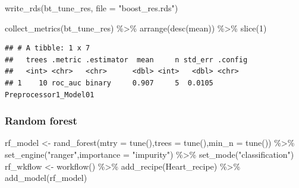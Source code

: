 \documentclass[
]{article}
\newenvironment{Shaded}{\begin{snugshade}}{\end{snugshade}}
\newcommand{\AttributeTok}[1]{\textcolor[rgb]{0.77,0.63,0.00}{#1}}
\newcommand{\DecValTok}[1]{\textcolor[rgb]{0.00,0.00,0.81}{#1}}
\newcommand{\FunctionTok}[1]{\textcolor[rgb]{0.00,0.00,0.00}{#1}}
\newcommand{\NormalTok}[1]{#1}
\newcommand{\OtherTok}[1]{\textcolor[rgb]{0.56,0.35,0.01}{#1}}
\newcommand{\SpecialCharTok}[1]{\textcolor[rgb]{0.00,0.00,0.00}{#1}}
\newcommand{\StringTok}[1]{\textcolor[rgb]{0.31,0.60,0.02}{#1}}
\begin{document}
\begin{Shaded}
\begin{Highlighting}[]
\FunctionTok{write\_rds}\NormalTok{(bt\_tune\_res, }\AttributeTok{file =} \StringTok{"boost\_res.rds"}\NormalTok{)}
\end{Highlighting}
\end{Shaded}

\begin{Shaded}
\begin{Highlighting}[]
\FunctionTok{collect\_metrics}\NormalTok{(bt\_tune\_res) }\SpecialCharTok{\%\textgreater{}\%} \FunctionTok{arrange}\NormalTok{(}\FunctionTok{desc}\NormalTok{(mean)) }\SpecialCharTok{\%\textgreater{}\%} \FunctionTok{slice}\NormalTok{(}\DecValTok{1}\NormalTok{)}
\end{Highlighting}
\end{Shaded}

\begin{verbatim}
## # A tibble: 1 x 7
##   trees .metric .estimator  mean     n std_err .config              
##   <int> <chr>   <chr>      <dbl> <int>   <dbl> <chr>                
## 1    10 roc_auc binary     0.907     5  0.0105 Preprocessor1_Model01
\end{verbatim}

\hypertarget{random-forest}{%
\subsubsection{Random forest}\label{random-forest}}

\begin{Shaded}
\begin{Highlighting}[]
\NormalTok{ rf\_model }\OtherTok{\textless{}{-}} \FunctionTok{rand\_forest}\NormalTok{(}\AttributeTok{mtry =} \FunctionTok{tune}\NormalTok{(),}\AttributeTok{trees =} \FunctionTok{tune}\NormalTok{(),}\AttributeTok{min\_n =} \FunctionTok{tune}\NormalTok{()) }\SpecialCharTok{\%\textgreater{}\%}
  \FunctionTok{set\_engine}\NormalTok{(}\StringTok{"ranger"}\NormalTok{,}\AttributeTok{importance =} \StringTok{"impurity"}\NormalTok{) }\SpecialCharTok{\%\textgreater{}\%}
  \FunctionTok{set\_mode}\NormalTok{(}\StringTok{"classification"}\NormalTok{)}
\NormalTok{ rf\_wkflow }\OtherTok{\textless{}{-}} \FunctionTok{workflow}\NormalTok{() }\SpecialCharTok{\%\textgreater{}\%}
  \FunctionTok{add\_recipe}\NormalTok{(Heart\_recipe) }\SpecialCharTok{\%\textgreater{}\%}
  \FunctionTok{add\_model}\NormalTok{(rf\_model)}
\end{Highlighting}
\end{Shaded}
\end{document}
